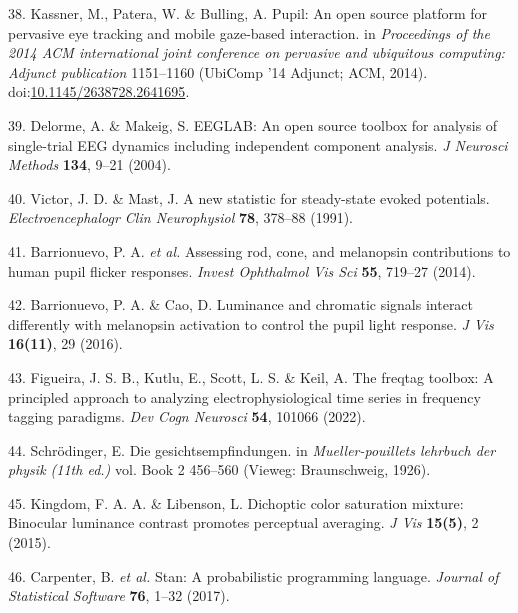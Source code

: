\documentclass[
]{article}
\begin{document}
\leavevmode\hypertarget{ref-Kassner2014}{}%
38. Kassner, M., Patera, W. \& Bulling, A. Pupil: An open source platform for pervasive eye tracking and mobile gaze-based interaction. in \emph{Proceedings of the 2014 ACM international joint conference on pervasive and ubiquitous computing: Adjunct publication} 1151--1160 (UbiComp '14 Adjunct; ACM, 2014). doi:\href{https://doi.org/10.1145/2638728.2641695}{10.1145/2638728.2641695}.

\leavevmode\hypertarget{ref-Delorme2004}{}%
39. Delorme, A. \& Makeig, S. EEGLAB: An open source toolbox for analysis of single-trial EEG dynamics including independent component analysis. \emph{J Neurosci Methods} \textbf{134}, 9--21 (2004).

\leavevmode\hypertarget{ref-Victor1991}{}%
40. Victor, J. D. \& Mast, J. A new statistic for steady-state evoked potentials. \emph{Electroencephalogr Clin Neurophysiol} \textbf{78}, 378--88 (1991).

\leavevmode\hypertarget{ref-Barrionuevo2014}{}%
41. Barrionuevo, P. A. \emph{et al.} Assessing rod, cone, and melanopsin contributions to human pupil flicker responses. \emph{Invest Ophthalmol Vis Sci} \textbf{55}, 719--27 (2014).

\leavevmode\hypertarget{ref-Barrionuevo2016}{}%
42. Barrionuevo, P. A. \& Cao, D. Luminance and chromatic signals interact differently with melanopsin activation to control the pupil light response. \emph{J Vis} \textbf{16(11)}, 29 (2016).

\leavevmode\hypertarget{ref-Figueira2022}{}%
43. Figueira, J. S. B., Kutlu, E., Scott, L. S. \& Keil, A. The freqtag toolbox: A principled approach to analyzing electrophysiological time series in frequency tagging paradigms. \emph{Dev Cogn Neurosci} \textbf{54}, 101066 (2022).

\leavevmode\hypertarget{ref-Schrodinger1926}{}%
44. Schrödinger, E. Die gesichtsempfindungen. in \emph{Mueller-pouillets lehrbuch der physik (11th ed.)} vol. Book 2 456--560 (Vieweg: Braunschweig, 1926).

\leavevmode\hypertarget{ref-Kingdom2015}{}%
45. Kingdom, F. A. A. \& Libenson, L. Dichoptic color saturation mixture: Binocular luminance contrast promotes perceptual averaging. \emph{J Vis} \textbf{15(5)}, 2 (2015).

\leavevmode\hypertarget{ref-Carpenter2017}{}%
46. Carpenter, B. \emph{et al.} Stan: A probabilistic programming language. \emph{Journal of Statistical Software} \textbf{76}, 1--32 (2017).
\end{document}
